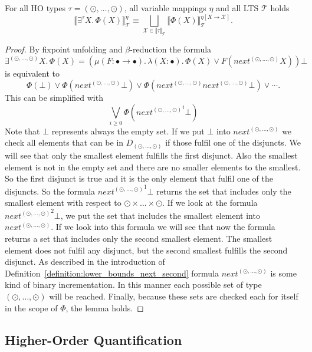 \begin{lemma}
    \label{lemma:existential_quantifier_second}
    For all HO types $\tau = (\odot, \dots, \odot)$, all variable mappings $\eta$ and all LTS $\mathcal{T}$ holds
    \[\llbracket \exists^\tau X.\,\Phi(X)\rrbracket^\eta_\mathcal{T} \equiv \underset{\mathcal{X} \in \llbracket \tau
    \rrbracket_\mathcal{T}}{\bigsqcup} \llbracket \Phi(X) \rrbracket^{\eta[X\rightarrow \mathcal{X}]}_\mathcal{T}.\]
\end{lemma}

\begin{proof}
    By fixpoint unfolding and $\beta$-reduction the formula 
    \[\exists^{(\odot, \dots, \odot)}X.\, \Phi(X) = (\mu (F \colon \bullet \rightarrow \bullet).\, \lambda (X
    \colon \bullet).\, \Phi(X) \vee F(next^{(\odot, \dots, \odot)} X)) \bot\] is equivalent to 
    \[\Phi(\bot) \vee \Phi(next^{(\odot, \dots, \odot)}\bot) \vee \Phi(next^{(\odot, \dots, \odot)} next^{(\odot, \dots, \odot)} \bot) \vee \dotsb. \]
    This can be simplified with
    \[\underset{i\geq0}{\bigvee} \Phi({next^{(\odot, \dots, \odot)}}^i \bot)\]
Note that $\bot$ represents always the empty set. If we put $\bot$ into $next^{(\odot, \dots, \odot)}$ we check all elements that can be in $D_{(\odot, \dots, \odot)}$ if those fulfil one of the disjuncts. We will see that only the smallest element fulfills the first disjunct. Also the smallest element is not in the empty set and there are no smaller elements to the smallest. So the first disjunct is true and it is the only element that fulfil one of the disjuncts. So the formula ${next^{(\odot, \dots, \odot)}}^1 \bot$ returns the set that includes only the smallest element with respect to $\odot \times \dots \times \odot$. If we look at the formula ${next^{(\odot, \dots, \odot)}}^2 \bot$, we put the set that includes the smallest element into $next^{(\odot, \dots, \odot)}$. If we look into this formula we will see that now the formula returns a set that includes only the second smallest element. The smallest element does not fulfil any disjunct, but the second smallest fulfills the second disjunct. As described in the introduction of Definition~\ref{definition:lower_bounds_next_second} formula $next^{(\odot, \dots, \odot)}$ is some kind of binary incrementation. In this manner each possible set of type $(\odot, \dots, \odot)$ will be reached. Finally, because these sets are checked each for itself in the scope of $\Phi$, the lemma holds.
\end{proof}

\subsection{Higher-Order Quantification}\label{subsec:higher-orderQuantification}


